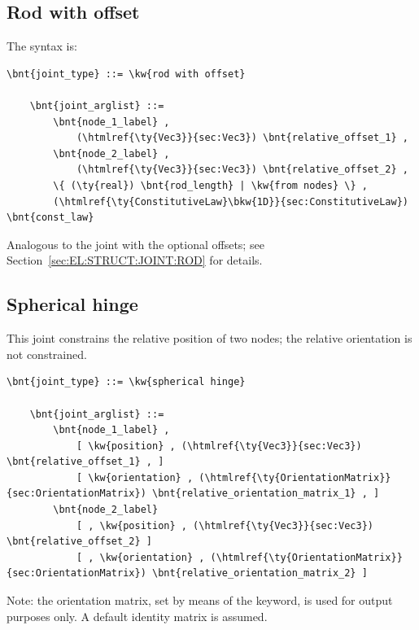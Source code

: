 \subsection{Rod with offset}
\label{sec:EL:STRUCT:JOINT:ROD_WITH_OFFSET}
The syntax is:
\begin{Verbatim}[commandchars=\\\{\}]
    \bnt{joint_type} ::= \kw{rod with offset}

    \bnt{joint_arglist} ::=
        \bnt{node_1_label} ,
            (\htmlref{\ty{Vec3}}{sec:Vec3}) \bnt{relative_offset_1} ,
        \bnt{node_2_label} ,
            (\htmlref{\ty{Vec3}}{sec:Vec3}) \bnt{relative_offset_2} ,
        \{ (\ty{real}) \bnt{rod_length} | \kw{from nodes} \} ,
        (\htmlref{\ty{ConstitutiveLaw}\bkw{1D}}{sec:ConstitutiveLaw}) \bnt{const_law}
\end{Verbatim}
Analogous to the  joint with the optional offsets;
see Section~\ref{sec:EL:STRUCT:JOINT:ROD} for details.



\subsection{Spherical hinge}
\label{sec:EL:STRUCT:JOINT:SPHERICAL_HINGE}
This joint constrains the relative position of two nodes;
the relative orientation is not constrained.
\begin{Verbatim}[commandchars=\\\{\}]
    \bnt{joint_type} ::= \kw{spherical hinge}

    \bnt{joint_arglist} ::= 
        \bnt{node_1_label} ,
            [ \kw{position} , (\htmlref{\ty{Vec3}}{sec:Vec3}) \bnt{relative_offset_1} , ]
            [ \kw{orientation} , (\htmlref{\ty{OrientationMatrix}}{sec:OrientationMatrix}) \bnt{relative_orientation_matrix_1} , ]
        \bnt{node_2_label}
            [ , \kw{position} , (\htmlref{\ty{Vec3}}{sec:Vec3}) \bnt{relative_offset_2} ]
            [ , \kw{orientation} , (\htmlref{\ty{OrientationMatrix}}{sec:OrientationMatrix}) \bnt{relative_orientation_matrix_2} ]
\end{Verbatim}
Note: the orientation matrix, set by means of the  keyword,
is used for output purposes only. 
A default identity matrix is assumed.

